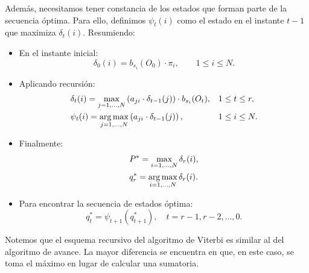 Además, necesitamos tener constancia de los estados que forman parte de la secuencia óptima. Para ello, definimos $\psi_t(i)$ como el estado en el instante $t-1$ que maximiza $\delta_t(i)$. Resumiendo:
\begin{itemize}
    \item En el instante inicial:
    \begin{equation*}
        \delta_0(i)=b_{s_i}(O_0)\cdot\pi_i, \qquad 1\leq i\leq N.
    \end{equation*}
    \item Aplicando recursión:
    \begin{align*}
        &\delta_t(i)=\max_{j=1,\dots,N}\left(a_{ji}\cdot\delta_{t-1}(j)\right) \cdot b_{s_i}(O_t), && 1\leq t\leq r, \\
        &\psi_t(i)=\operatorname*{\arg\max}_{j=1,\dots,N}\left(a_{ji}\cdot\delta_{t-1}(j)\right),  &&  1\leq i\leq N.
    \end{align*}
    \item Finalmente:
    \begin{align*}
        & P^* = \max_{i=1,\dots,N} \delta_r(i),\\
        & q_r^*=\operatorname*{\arg\max}_{i=1,\dots,N} \delta_r(i).
    \end{align*} 
    \item Para encontrar la secuencia de estados óptima:
    \[q_t^*=\psi_{t+1}(q_{t+1}^*), \quad t=r-1,r-2,\dots,0.\]
\end{itemize}
Notemos que el esquema recursivo del algoritmo de Viterbi es similar al del algoritmo de avance. La mayor diferencia se encuentra en que, en este caso, se toma el máximo en lugar de calcular una sumatoria.

